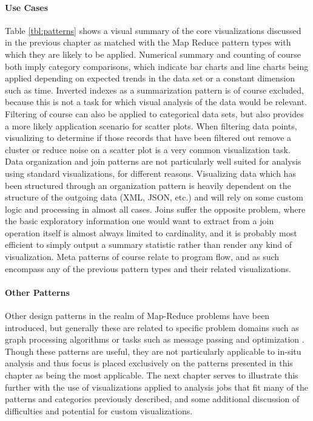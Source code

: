 \paragraph{Use Cases}
Table \ref{tbl:patterns} shows a visual summary of the core visualizations discussed in the previous chapter as matched with the Map Reduce pattern types with which they are likely to be applied. Numerical summary and counting of course both imply category comparisons, which indicate bar charts and line charts being applied depending on expected trends in the data set or a constant dimension such as time. Inverted indexes as a summarization pattern is of course excluded, because this is not a task for which visual analysis of the data would be relevant. Filtering of course can also be applied to categorical data sets, but also provides a more likely application scenario for scatter plots. When filtering data points, visualizing to determine if those records that have been filtered out remove a cluster or reduce noise on a scatter plot is a very common visualization task. Data organization and join patterns are not particularly well suited for analysis using standard visualizations, for different reasons. Visualizing data which has been structured through an organization pattern is heavily dependent on the structure of the outgoing data (XML, JSON, etc.) and will rely on some custom logic and processing in almost all cases. Joins suffer the opposite problem, where the basic exploratory information one would want to extract from a join operation itself is almost always limited to cardinality, and it is probably most efficient to simply output a summary statistic rather than render any kind of visualization. Meta patterns of course relate to program flow, and as such encompass any of the previous pattern types and their related visualizations. 

\paragraph{Other Patterns}
Other design patterns in the realm of Map-Reduce problems have been introduced, but generally these are related to specific problem domains such as graph processing algorithms or tasks such as message passing and optimization \citep{Lin2010}. Though these patterns are useful, they are not particularly applicable to in-situ analysis and thus focus is placed exclusively on the patterns presented in this chapter as being the most applicable. The next chapter serves to illustrate this further with the use of visualizations applied to analysis jobs that fit many of the patterns and categories previously described, and some additional discussion of difficulties and potential for custom visualizations. 

